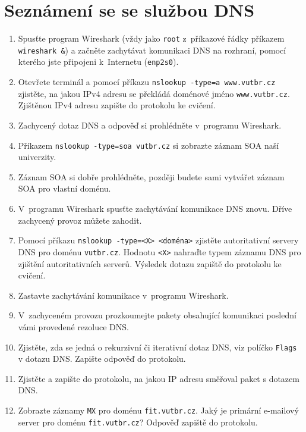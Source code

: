 \section{Seznámení se se službou DNS}
\begin{enumerate}
    \item Spusťte program Wireshark (vždy jako \texttt{root} z~příkazové řádky příkazem \texttt{wireshark \&}) a začněte zachytávat komunikaci DNS na rozhraní, pomocí kterého jste připojeni k~Internetu (\texttt{enp2s0}).
    \item Otevřete terminál a pomocí příkazu \texttt{nslookup -type=a www.vutbr.cz} zjistěte, na jakou IPv4 adresu se překládá doménové jméno \texttt{www.vutbr.cz}. Zjištěnou IPv4 adresu zapište do protokolu ke cvičení.
    \item Zachycený dotaz DNS a odpověď si prohlédněte v~programu Wireshark.
    \item Příkazem \texttt{nslookup -type=soa vutbr.cz} si zobrazte záznam SOA naší univerzity.
    \item Záznam SOA si dobře prohlédněte, později budete sami vytvářet záznam SOA pro vlastní doménu.
    \item V~programu Wireshark spusťte zachytávání komunikace DNS znovu. Dříve zachycený provoz můžete zahodit.
    \item Pomocí příkazu \texttt{nslookup -type=<X> <doména>} zjistěte autoritativní servery DNS pro doménu \texttt{vutbr.cz}. Hodnotu \texttt{<X>} nahraďte typem záznamu DNS pro zjištění autoritativních serverů. Výsledek dotazu zapiště do protokolu ke cvičení.
    \item Zastavte zachytávání komunikace v~programu Wireshark.
    \item V~zachyceném provozu prozkoumejte pakety obsahující komunikaci poslední vámi provedené rezoluce DNS.
    \item Zjistěte, zda se jedná o rekurzivní či iterativní dotaz DNS, viz políčko \texttt{Flags} v dotazu DNS. Zapište odpověď do protokolu.
    \item Zjistěte a zapište do protokolu, na jakou IP adresu směřoval paket s dotazem DNS.
    \item Zobrazte záznamy \texttt{MX} pro doménu \texttt{fit.vutbr.cz}. Jaký je primární e-mailový server pro doménu \texttt{fit.vutbr.cz}? Odpověď zapiště do protokolu.
\end{enumerate}

